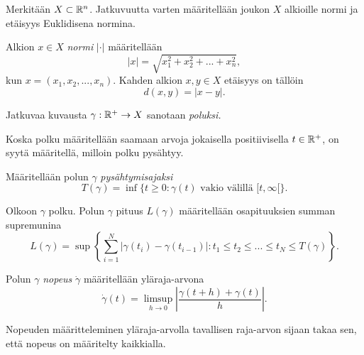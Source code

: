 \documentclass[12pt,oneside,a4paper]{amsbook} %
\begin{document}
Merkitään $X \subset \mathbb{R}^n$. Jatkuvuutta varten määritellään joukon $X$ alkioille normi ja etäisyys Euklidisena normina.
\begin{definition}
    Alkion $x \in X$ \textit{normi} $|\cdot|$ määritellään
    \begin{equation*}
        |x| = \sqrt{x_1^2 + x_2^2 + ... + x_n^2},
    \end{equation*}
    kun $x = (x_1, x_2, ... , x_n)$. Kahden alkion $x, y \in X$ etäisyys on tällöin
    \begin{equation*}
        d(x, y) = |x - y|.
    \end{equation*}
\end{definition}

\begin{definition}
    Jatkuvaa kuvausta $\gamma:{\mathbb{R}^{+}} \to X$ sanotaan \textit{poluksi.}
\end{definition}

Koska polku määritellään saamaan arvoja jokaisella positiivisella $t \in {\mathbb{R}^{+}}$, on syytä määritellä, milloin polku pysähtyy.

\begin{definition}
    Määritellään polun $\gamma$ \textit{pysähtymisajaksi} 
    \begin{equation*}
        T(\gamma) = \inf\{t\ge0:\gamma(t) \text{ vakio välillä } [t,\infty[ \}.
    \end{equation*}
\end{definition}

\begin{definition}
    Olkoon $\gamma$ polku. Polun $\gamma$ pituus $L(\gamma)$ määritellään osapituuksien summan supremunina
    \begin{equation*}
        L(\gamma) = \sup\left\{\sum_{i=1}^N|\gamma(t_i) - \gamma(t_{i-1})| : t_1 \le t_2 \le ... \le t_N \le T(\gamma)\right\}.
    \end{equation*}
\end{definition}

\begin{definition}
    Polun $\gamma$ \textit{nopeus} $\dot \gamma$ määritellään yläraja-arvona
    \begin{equation*}
        \dot\gamma(t) = \limsup_{h\to 0} \left|\frac{\gamma(t+h) + \gamma(t)}{h}\right|.
    \end{equation*}
\end{definition}

Nopeuden määritteleminen yläraja-arvolla tavallisen raja-arvon sijaan takaa sen, että nopeus on määritelty kaikkialla.
\end{document}
